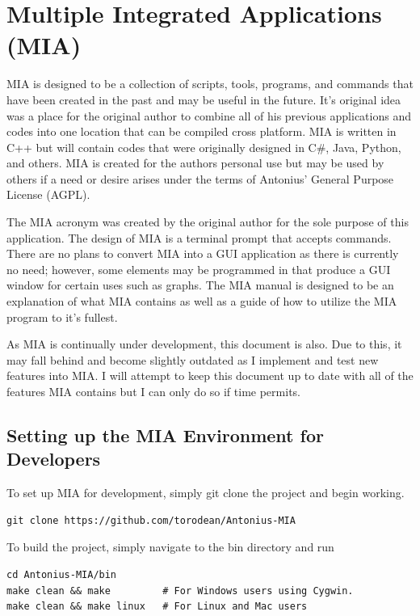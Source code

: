 \chapter{Multiple Integrated Applications (MIA)}
\pagestyle{fancy}

MIA is designed to be a collection of scripts, tools, programs, and commands that have been created in the past and may be useful in the future. It's original idea was a place for the original author to combine all of his previous applications and codes into one location that can be compiled cross platform. MIA is written in C++ but will contain codes that were originally designed in C\#, Java, Python, and others. MIA is created for the authors personal use but may be used by others if a need or desire arises under the terms of Antonius’ General Purpose License (AGPL). 

The MIA acronym was created by the original author for the sole purpose of this application. The design of MIA is a terminal prompt that accepts commands. There are no plans to convert MIA into a GUI application as there is currently no need; however, some elements may be programmed in that produce a GUI window for certain uses such as graphs. The MIA manual is designed to be an explanation of what MIA contains as well as a guide of how to utilize the MIA program to it's fullest. 

As MIA is continually under development, this document is also. Due to this, it may fall behind and become slightly outdated as I implement and test new features into MIA. I will attempt to keep this document up to date with all of the features MIA contains but I can only do so if time permits.

\section{Setting up the MIA Environment for Developers}

To set up MIA for development, simply git clone the project and begin working.

\begin{lstlisting}
git clone https://github.com/torodean/Antonius-MIA
\end{lstlisting}

To build the project, simply navigate to the bin directory and run

\begin{lstlisting}
cd Antonius-MIA/bin
make clean && make         # For Windows users using Cygwin.
make clean && make linux   # For Linux and Mac users
\end{lstlisting}


